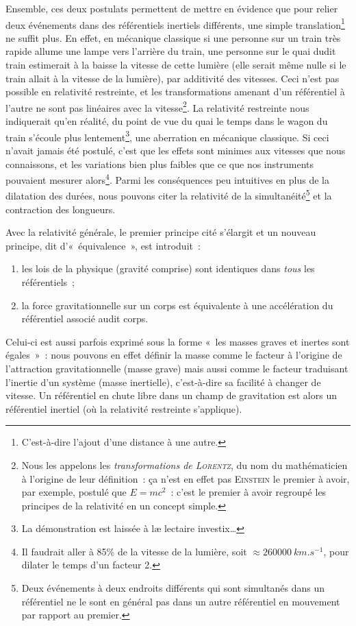 \documentclass[../main/main.tex]{subfiles}
\begin{document}
Ensemble, ces deux postulats permettent de mettre en évidence que pour relier
deux événements dans des référentiels inertiels différents, une simple
translation\footnote{C'est-à-dire l'ajout d'une distance à une autre.} ne suffit
plus. En effet, en mécanique classique si une personne sur un train très rapide
allume une lampe vers l'arrière du train, une personne sur le quai dudit train
estimerait à la baisse la vitesse de cette lumière (elle serait même nulle si le
train allait à la vitesse de la lumière), par additivité des vitesses. Ceci
n'est pas possible en relativité restreinte, et les transformations amenant d'un
référentiel à l'autre ne sont pas linéaires avec la vitesse\footnote{Nous les
    appelons les \textit{transformations de \textsc{Lorentz}}, du nom du
    mathématicien à l'origine de leur définition~: ça n'est en effet pas
    \textsc{Einstein} le premier à avoir, par exemple, postulé que $E = mc^2$~:
    c'est le premier à avoir regroupé les principes de la relativité en un
concept simple.}. La relativité restreinte nous indiquerait qu'en réalité, du
point de vue du quai le temps dans le wagon du train s'écoule plus
lentement\footnote{La démonstration est laissée à læ lectaire investix…},
une aberration en mécanique classique. Si ceci n'avait jamais été postulé,
c'est que les effets sont minimes aux vitesses que nous connaissons, et les
variations bien plus faibles que ce que nos instruments pouvaient mesurer
alors\footnote{Il faudrait aller à 85\% de la vitesse de la lumière, soit
    $\approx \SI{260000}{km.s^{-1}}$, pour
dilater le temps d'un facteur 2.}. Parmi les conséquences peu intuitives en
plus de la dilatation des durées, nous pouvons citer la relativité de la
simultanéité\footnote{Deux événements à deux endroits différents qui sont
    simultanés dans un référentiel ne le sont en général pas dans un autre
référentiel en mouvement par rapport au premier.} et la contraction des
longueurs.

Avec la relativité générale, le premier principe cité s'élargit et un nouveau
principe, dit d'«~équivalence~», est introduit~:
\begin{enumerate}
    \item les lois de la physique (gravité comprise) sont identiques dans
        \textit{tous} les référentiels~;
    \item la force gravitationnelle sur un corps est équivalente à une
        accélération du référentiel associé audit corps.
\end{enumerate}
Celui-ci est aussi parfois exprimé sous la forme «~les masses graves et inertes
sont égales~»~: nous pouvons en effet définir la masse comme le facteur à
l'origine de l'attraction gravitationnelle (masse grave) mais aussi comme le
facteur traduisant l'inertie d'un système (masse inertielle), c'est-à-dire sa
facilité à changer de vitesse. Un référentiel en chute libre dans un champ de
gravitation est alors un référentiel inertiel (où la relativité restreinte
s'applique).
\end{document}
